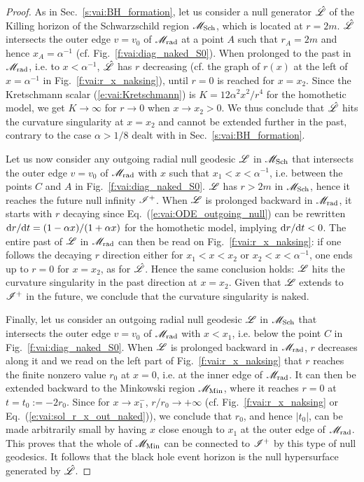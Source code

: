 \begin{proof}
As in Sec.~\ref{s:vai:BH_formation}, let us consider a null generator
$\hat{\mathscr{L}}$ of the Killing horizon of the Schwarzschild region
$\mathscr{M}_{\rm Sch}$, which is located at $r=2m$.
$\hat{\mathscr{L}}$ intersects the outer edge $v=v_0$ of $\mathscr{M}_{\rm rad}$ at a
point $A$ such that $r_A=2m$ and hence $x_A=\alpha^{-1}$ (cf. Fig.~\ref{f:vai:diag_naked_S0}). When
prolonged to the past in $\mathscr{M}_{\rm rad}$, i.e. to $x < \alpha^{-1}$,
$\hat{\mathscr{L}}$ has $r$ decreasing (cf. the graph of $r(x)$ at the left of
$x=\alpha^{-1}$ in Fig.~\ref{f:vai:r_x_naksing}), until $r=0$ is reached for
$x=x_2$. Since the Kretschmann scalar (\ref{e:vai:Kretschmann}) is
$K = 12 \alpha^2 x^2 / r^4$ for the homothetic model, we get $K\to \infty$
for $r\to 0$ when $x\to x_2 > 0$. We thus conclude that $\hat{\mathscr{L}}$ hits
the curvature singularity at $x=x_2$ and cannot be extended further in the
past, contrary to the case $\alpha > 1/8$ dealt with in Sec.~\ref{s:vai:BH_formation}.

Let us now consider any outgoing radial null geodesic $\mathscr{L}$ in $\mathscr{M}_{\rm Sch}$
that intersects the outer edge $v=v_0$ of $\mathscr{M}_{\rm rad}$ with
$x$ such that $x_1 < x < \alpha^{-1}$, i.e. between the points $C$ and $A$
in Fig.~\ref{f:vai:diag_naked_S0}. $\mathscr{L}$ has $r> 2m$ in $\mathscr{M}_{\rm Sch}$,
hence it reaches the future null infinity $\mathscr{I}^+$. When $\mathscr{L}$
is prolonged backward in $\mathscr{M}_{\rm rad}$, it starts with
$r$ decaying since
Eq.~(\ref{e:vai:ODE_outgoing_null}) can be rewritten $\mathrm{d} r/\mathrm{d} t = (1 - \alpha x)/(1 + \alpha x)$
for the homothetic model, implying $\mathrm{d} r / \mathrm{d} t <0$. The entire past of $\mathscr{L}$ in $\mathscr{M}_{\rm rad}$ can then be read on Fig.~\ref{f:vai:r_x_naksing}: if one
follows the decaying $r$ direction either for $x_1 < x < x_2$ or $x_2 < x < \alpha^{-1}$,
one ends up to $r=0$ for $x=x_2$, as for $\hat{\mathscr{L}}$. Hence the same conclusion holds:
$\mathscr{L}$ hits the curvature singularity in the past direction at $x=x_2$.
Given that $\mathscr{L}$ extends to $\mathscr{I}^+$ in the future, we conclude that
the curvature singularity is naked.

Finally, let us consider an outgoing radial null geodesic $\mathscr{L}$ in $\mathscr{M}_{\rm Sch}$ that intersects the outer edge $v=v_0$ of $\mathscr{M}_{\rm rad}$ with
$x < x_1$, i.e. below the point $C$ in Fig.~\ref{f:vai:diag_naked_S0}. When $\mathscr{L}$ is prolonged backward in $\mathscr{M}_{\rm rad}$, $r$ decreases along it
and we read on the left part of Fig.~\ref{f:vai:r_x_naksing} that $r$ reaches
the finite nonzero value $r_0$ at $x=0$, i.e. at the inner edge of $\mathscr{M}_{\rm rad}$. It can then be extended backward to the Minkowski region $\mathscr{M}_{\rm Min}$, where it reaches $r=0$ at $t=t_0:=-2r_0$.
Since for $x\to x_1^-$, $r/r_0\to +\infty$ (cf. Fig.~\ref{f:vai:r_x_naksing} or Eq.~(\ref{e:vai:sol_r_x_out_naked})), we conclude that $r_0$, and hence $|t_0|$,
can be made arbitrarily small by having $x$ close enough to $x_1$ at the outer edge of $\mathscr{M}_{\rm rad}$.
This proves that the whole of $\mathscr{M}_{\rm Min}$ can be connected to $\mathscr{I}^+$ by this type of null geodesics. It follows
that the black hole event horizon is the null hypersurface generated by $\hat{\mathscr{L}}$.
\end{proof}

